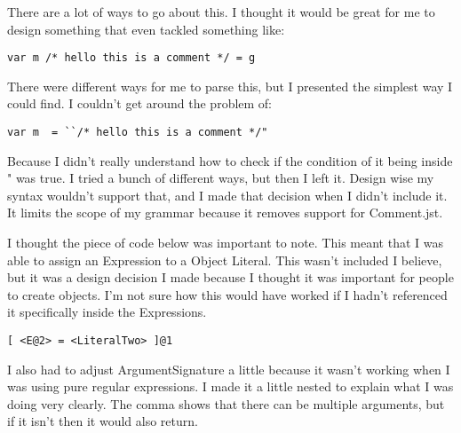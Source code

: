 \documentclass[11pt, oneside]{article}
\begin{document}
\par There are a lot of ways to go about this. I thought it would be great for me to design something that even tackled something like:

\begin{lstlisting}
var m /* hello this is a comment */ = g
\end{lstlisting}

\par There were different ways for me to parse this, but I presented the simplest way I could find. I couldn't get around the problem of:

\begin{lstlisting}
var m  = ``/* hello this is a comment */"
\end{lstlisting}

\par Because I didn't really understand how to check if the condition of it being inside " was true. I tried a bunch of different ways, but then I left it. Design wise my syntax wouldn't support that, and I made that decision when I didn't include it. It limits the scope of my grammar because it removes support for Comment.jst.

\par I thought the piece of code below was important to note. This meant that I was able to assign an Expression to a Object Literal. This wasn't included I believe, but it was a design decision I made because I thought it was important for people to create objects. I'm not sure how this would have worked if I hadn't referenced it specifically inside the Expressions.

\begin{lstlisting}
[ <E@2> = <LiteralTwo> ]@1
\end{lstlisting}

\par I also had to adjust ArgumentSignature a little because it wasn't working when I was using pure regular expressions. I made it a little nested to explain what I was doing very clearly. The comma shows that there can be multiple arguments, but if it isn't then it would also return. 
\end{document}
